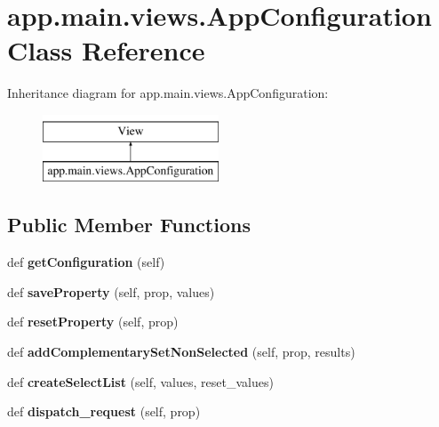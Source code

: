 \hypertarget{classapp_1_1main_1_1views_1_1AppConfiguration}{}\section{app.\+main.\+views.\+App\+Configuration Class Reference}
\label{classapp_1_1main_1_1views_1_1AppConfiguration}
Inheritance diagram for app.\+main.\+views.\+App\+Configuration\+:\begin{figure}[H]
\begin{center}
\leavevmode
\includegraphics[height=2.000000cm]{classapp_1_1main_1_1views_1_1AppConfiguration}
\end{center}
\end{figure}
\subsection*{Public Member Functions}
\begin{DoxyCompactItemize}
\item 
\mbox{\label{classapp_1_1main_1_1views_1_1AppConfiguration_ac382bd938eaeae9ee015eb6db9be4416}} 
def {\bfseries get\+Configuration} (self)
\item 
\mbox{\label{classapp_1_1main_1_1views_1_1AppConfiguration_a42b09596ecba29500eba6c491b96e136}} 
def {\bfseries save\+Property} (self, prop, values)
\item 
\mbox{\label{classapp_1_1main_1_1views_1_1AppConfiguration_a3bea99e1f7bac0479ab9186252ef3c51}} 
def {\bfseries reset\+Property} (self, prop)
\item 
\mbox{\label{classapp_1_1main_1_1views_1_1AppConfiguration_a614216c4b18ab6556dac3ac23b5f1c75}} 
def {\bfseries add\+Complementary\+Set\+Non\+Selected} (self, prop, results)
\item 
\mbox{\label{classapp_1_1main_1_1views_1_1AppConfiguration_ac1380451be3a057136b4b5fa9ca3b688}} 
def {\bfseries create\+Select\+List} (self, values, reset\+\_\+values)
\item 
\mbox{\label{classapp_1_1main_1_1views_1_1AppConfiguration_a8971f657ff05ce067dcbd2bc9b994616}} 
def {\bfseries dispatch\+\_\+request} (self, prop)
\end{DoxyCompactItemize}
